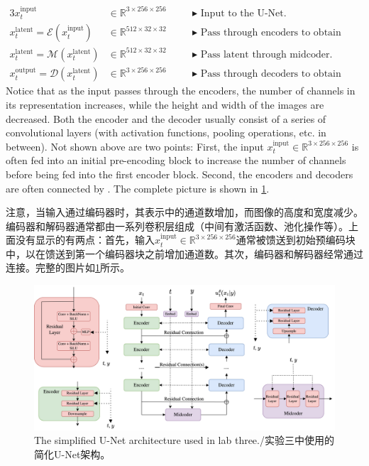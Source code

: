 \begin{alignat*}{3}
    x^{\text{input}}_t &\in \mathbb{R}^{3 \times 256 \times 256} \quad  
    && \blacktriangleright\,\,\text{Input to the U-Net.}\\
    x^{\text{latent}}_t = \mathcal{E}(x^{\text{input}}_t) &\in \mathbb{R}^{512 \times 32 \times 32} \quad && \blacktriangleright\,\,\text{Pass through encoders to obtain latent.}\\
    x^{\text{latent}}_t = \mathcal{M}(x^{\text{latent}}_t) &\in \mathbb{R}^{512 \times 32 \times 32} \quad && \blacktriangleright\,\,\text{Pass latent through midcoder.}\\
    x^{\text{output}}_t = \mathcal{D}(x^{\text{latent}}_t) &\in \mathbb{R}^{3 \times 256 \times 256} \quad && \blacktriangleright\,\,\text{Pass through decoders to obtain output.}
\end{alignat*}
Notice that as the input passes through the encoders, the number of channels in its representation increases, while the height and width of the images are decreased. Both the encoder and the decoder usually consist of a series of convolutional layers (with activation functions, pooling operations, etc. in between). Not shown above are two points: First, the input $x^{\text{input}}_t\in \mathbb{R}^{3 \times 256 \times 256}$ is often fed into an initial pre-encoding block to increase the number of channels before being fed into the first encoder block. Second, the encoders and decoders are often connected by . The complete picture is shown in \cref{fig:unet}.

注意，当输入通过编码器时，其表示中的通道数增加，而图像的高度和宽度减少。编码器和解码器通常都由一系列卷积层组成（中间有激活函数、池化操作等）。上面没有显示的有两点：首先，输入$x^{\text{input}}_t\in \mathbb{R}^{3 \times 256 \times 256}$通常被馈送到初始预编码块中，以在馈送到第一个编码器块之前增加通道数。其次，编码器和解码器经常通过连接。完整的图片如\cref{fig:unet}所示。

\begin{figure}
    \centering
    \includegraphics[width=\textwidth]{figures/unet.png}
    \caption{The simplified U-Net architecture used in lab three./实验三中使用的简化U-Net架构。}
    \label{fig:unet}
\end{figure}


